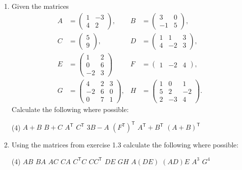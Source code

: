 \documentclass[a4paper,11pt]{article}
\begin{document}
\begin{enumerate}[label=1.\arabic*]
    \item Given the matrices
    \begin{align*}
        A &= \begin{pmatrix} 1 & -3 \\ 4 & 2 \end{pmatrix}, &
        B &= \begin{pmatrix} 3 & 0 \\ -1 & 5 \end{pmatrix}, \\
        C &= \begin{pmatrix} 5 \\ 9 \end{pmatrix}, &
        D &= \begin{pmatrix} 1 & 1 & 3 \\ 4 & -2 & 3 \end{pmatrix}, \\
        E &= \begin{pmatrix} 1 & 2 \\ 0 & 6 \\ -2 & 3 \end{pmatrix} &
        F &= \begin{pmatrix} 1 & -2 & 4 \end{pmatrix}, \\
        G &= \begin{pmatrix} 4 & 2 & 3 \\ -2 & 6 & 0 \\ 0 & 7 & 1 \end{pmatrix}, &
        H &= \begin{pmatrix} 1 & 0 & 1 \\ 5 & 2 & -2 \\ 2 & -3 & 4 \end{pmatrix}.
    \end{align*}
    Calculate the following where possible:
    \begin{tasks}(4)
        \task $A + B$
        \task $B + C$
        \task $A^\mathsf{T}$
        \task $C^\mathsf{T}$
        \task $3B - A$
        \task $(F^\mathsf{T})^\mathsf{T}$
        \task $A^\mathsf{T} + B^\mathsf{T}$
        \task $(A + B)^\mathsf{T}$
    \end{tasks}

    \item Using the matrices from exercise 1.3 calculate the following where possible:
    \begin{tasks}(4)
        \task $AB$
        \task $BA$
        \task $AC$
        \task $CA$
        \task $C^\mathsf{T}C$
        \task $CC^\mathsf{T}$
        \task $DE$
        \task $GH$
        \task $A(DE)$
        \task $(AD)E$
        \task $A^3$
        \task $G^4$
    \end{tasks}


\end{enumerate}
\end{document}
